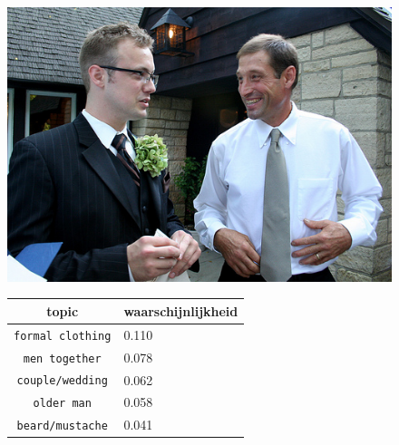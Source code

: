 \begin{figure}[!htb]
    \centering
    \begin{minipage}[t]{.5\linewidth}
    \centering
    \vspace{0pt}
    \includegraphics[width=\textwidth]{Images/LDA/2773744784.jpg}
    \end{minipage}\hfill
    \begin{minipage}[t]{.5\textwidth}
    \centering
    \vspace{0pt}
    \begin{tabular}{cl}
            topic                           & waarschijnlijkheid\\
            \hline
            \texttt{formal clothing}             & 0.110 \\
            \texttt{men together}                   & 0.078 \\
            \texttt{couple/wedding}                 & 0.062 \\
            \texttt{older man}           & 0.058 \\
            \texttt{beard/mustache}        & 0.041\\
            \hline
        \end{tabular}
    \end{minipage}
\end{figure}
\newpage

